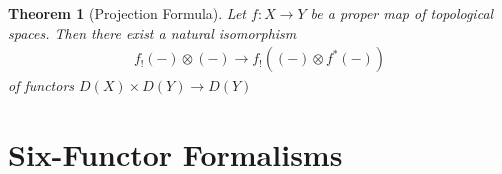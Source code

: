 \documentclass[a4paper,dvipdfmx,11pt,reqno]{amsart}
\newcommand{\bbR}{\mathbb{R}}
\newcommand{\bbZ}{\mathbb{Z}}
\newtheorem{theorem}{Theorem}[section]
\theoremstyle{definition}
\begin{document}
\begin{theorem}[Projection Formula] \label{thrm.projection_formula}
  Let $f : X \to Y$ be a proper map of topological spaces.
  Then there exist a natural isomorphism
  \begin{align*}
    f_{!}(-) \otimes (-) \to f_{!}((-) \otimes f^{*}(-))
  \end{align*}
  of functors $D(X) \times D(Y) \to D(Y)$
\end{theorem}




\section{Six-Functor Formalisms} \label{sec.six_functors_formalisms}
\end{document}
